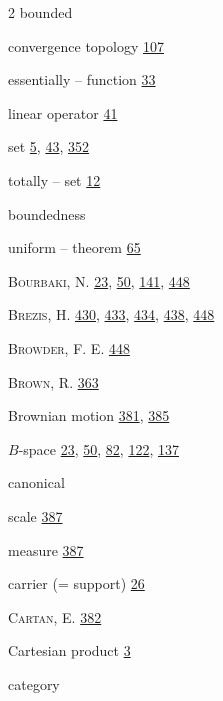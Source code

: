 \begin{multicols}{2}
\noindent bounded\par
\hspace*{1.1em}convergence topology \hyperlink{page.107}{107}\par
\hspace*{1.1em}essentially -- function \hyperlink{page.33}{33}\par
\hspace*{1.1em}linear operator \hyperlink{page.41}{41}\par
\hspace*{1.1em}set \hyperlink{page.5}{5}, \hyperlink{page.43}{43}, \hyperlink{page.352}{352}\par
\hspace*{1.1em}totally -- set \hyperlink{page.12}{12}\par
\noindent boundedness\par
\hspace*{1.1em}uniform -- theorem \hyperlink{page.65}{65}\par
\noindent \textsc{Bourbaki}, N. \hyperlink{page.23}{23}, \hyperlink{page.50}{50}, \hyperlink{page.141}{141}, \hyperlink{page.448}{448}\par
\noindent \textsc{Brezis}, H. \hyperlink{page.430}{430}, \hyperlink{page.433}{433}, \hyperlink{page.434}{434}, \hyperlink{page.438}{438}, \hyperlink{page.448}{448}\par
\noindent \textsc{Browder}, F. E. \hyperlink{page.448}{448}\par
\noindent \textsc{Brown}, R. \hyperlink{page.363}{363}\par
\noindent Brownian motion \hyperlink{page.381}{381}, \hyperlink{page.385}{385}\par
\noindent $B$-space \hyperlink{page.23}{23}, \hyperlink{page.50}{50}, \hyperlink{page.82}{82}, \hyperlink{page.122}{122}, \hyperlink{page.137}{137}\par
\noindent canonical\par
\hspace*{1.1em}scale \hyperlink{page.387}{387}\par
\hspace*{1.1em}measure \hyperlink{page.387}{387}\par
\noindent carrier (= support) \hyperlink{page.26}{26}\par
\noindent \textsc{Cartan}, E. \hyperlink{page.382}{382}\par
\noindent Cartesian product \hyperlink{page.3}{3}\par
\noindent category\par

\end{multicols}

